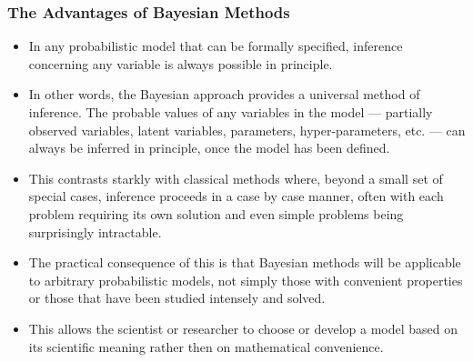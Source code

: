 \documentclass{slides}
\begin{document}
\begin{frame}
	\frametitle{The Advantages of Bayesian Methods}

	\begin{itemize}	
		
		
	\item  In any probabilistic model that can be formally specified,
		inference concerning any variable is always possible in
		principle. 

	\item In other words, the Bayesian approach provides a universal method
		of inference. The probable values of any variables in the model
		--- partially observed variables, latent variables, parameters,
		hyper-parameters, etc. --- can always be inferred in principle,
		once the model has been defined. 

	\item This contrasts starkly with classical methods where, beyond a
		small set of special cases, inference proceeds in a case by
		case manner, often with each problem requiring its own solution
		and even simple problems being surprisingly intractable.  

	\item The practical consequence of this is that Bayesian methods will
		be applicable to arbitrary probabilistic models, not simply
		those with convenient properties or those that have been
		studied intensely and solved.  

	\item This allows the scientist or researcher to choose or develop a
		model based on its scientific meaning rather then on
		mathematical convenience. 

\end{itemize}
\end{frame}
\end{document}
